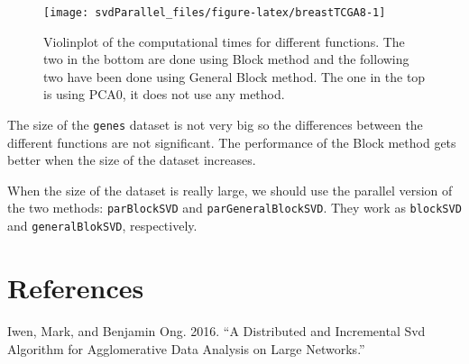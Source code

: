 \documentclass[]{article}
\begin{document}
\begin{figure}

{\centering \texttt{[image: svdParallel\_files/figure-latex/breastTCGA8-1]} 

}

\caption{Violinplot of the computational times for different functions. The two in the bottom are done using Block method and the following two have been done using General Block method. The one in the top is using PCA0, it does not use any method.}\label{fig:breastTCGA8}
\end{figure}

The size of the \texttt{genes} dataset is not very big so the
differences between the different functions are not significant. The
performance of the Block method gets better when the size of the dataset
increases.

When the size of the dataset is really large, we should use the parallel
version of the two methods: \texttt{parBlockSVD} and
\texttt{parGeneralBlockSVD}. They work as \texttt{blockSVD} and
\texttt{generalBlokSVD}, respectively.

\section*{References}\label{references}

\hypertarget{refs}{}
\hypertarget{ref-ref}{}
Iwen, Mark, and Benjamin Ong. 2016. ``A Distributed and Incremental Svd
Algorithm for Agglomerative Data Analysis on Large Networks.''
\end{document}
